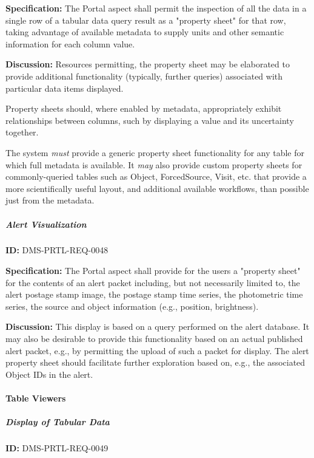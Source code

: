 \documentclass[SE,toc]{lsstdoc}
\begin{document}
\textbf{Specification:}
The Portal aspect shall permit the inspection of all the data in a single row of a tabular data query result as a "property sheet" for that row, taking advantage of available metadata to supply units and other semantic information for each column value.

\textbf{Discussion:}
Resources permitting, the property sheet may be elaborated to provide additional functionality (typically, further queries) associated with particular data items displayed.

Property sheets should, where enabled by metadata, appropriately exhibit relationships between columns, such by displaying a value and its uncertainty together.

The system \textit{must} provide a generic property sheet functionality for any table for which full metadata is available. It \textit{may} also provide custom property sheets for commonly-queried tables such as Object, ForcedSource, Visit, etc. that provide a more scientifically useful layout, and additional available workflows, than possible just from the metadata.

\subparagraph{Alert Visualization}\hfill  %

\label{DMS-PRTL-REQ-0048}
\textbf{ID:} DMS-PRTL-REQ-0048

\textbf{Specification:}
The Portal aspect shall provide for the users a "property sheet" for the contents of an alert packet including, but not necessarily limited to, the alert postage stamp image, the postage stamp time series, the photometric time series, the source and object information (e.g., position, brightness).

\textbf{Discussion:}
This display is based on a query performed on the alert database.  It may also be desirable to provide this functionality based on an actual published alert packet, e.g., by permitting the upload of such a packet for display.
The alert property sheet should facilitate further exploration based on, e.g., the associated Object IDs in the alert.

\paragraph{Table Viewers}\hfill  %

\subparagraph{Display of Tabular Data}\hfill  %

\label{DMS-PRTL-REQ-0049}
\textbf{ID:} DMS-PRTL-REQ-0049
\end{document}
